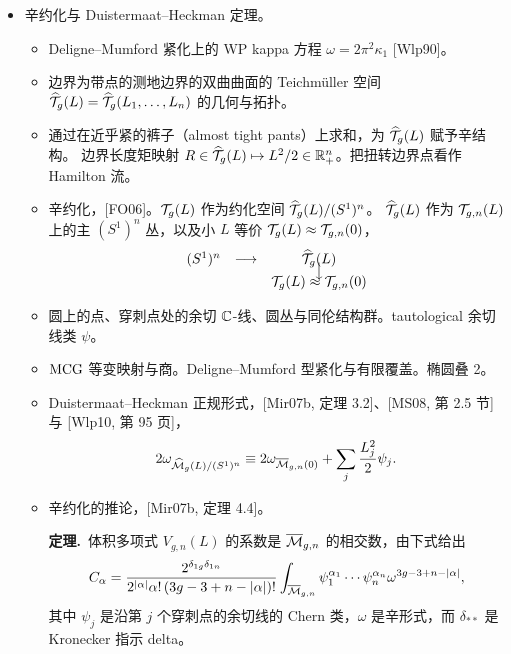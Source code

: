 \begin{itemize}[leftmargin=1.6em,itemsep=2pt,topsep=2pt]
\item 辛约化与 Duistermaat--Heckman 定理。
  \begin{itemize}[leftmargin=1.6em,itemsep=2pt,topsep=2pt]
  \item Deligne--Mumford 紧化上的 WP kappa 方程 $\omega=2\pi^2\kappa_1$ [Wlp90]。
  \item 边界为带点的测地边界的双曲曲面的 Teichmüller 空间
    $\widehat{\mathcal{T}}_g(L)=\widehat{\mathcal{T}}_g(L_1,\ldots,L_n)$ 的几何与拓扑。
  \item 通过在近乎紧的裤子（almost tight pants）上求和，为 $\widehat{\mathcal{T}}_g(L)$ 赋予辛结构。
    边界长度矩映射 $R\in\widehat{\mathcal{T}}_g(L)\mapsto L^2/2\in\mathbb{R}^n_+$。把扭转边界点看作
    Hamilton 流。
  \item 辛约化，[FO06]。$\mathcal{T}_g(L)$ 作为约化空间 $\widehat{\mathcal{T}}_g(L)/(S^1)^n$。
    $\widehat{\mathcal{T}}_g(L)$ 作为 $\mathcal{T}_{g,n}(L)$ 上的主 $(S^1)^n$ 丛，以及小 $L$ 等价
    $\mathcal{T}_g(L)\approx\mathcal{T}_{g,n}(0)$，
    \[
    \begin{array}{ccc}
    (S^1)^n & \longrightarrow & \widehat{\mathcal{T}}_g(L)\\[-4pt]
    & & \big\downarrow\\[-4pt]
    & & \mathcal{T}_g(L)\approx\mathcal{T}_{g,n}(0)
    \end{array}
    \]
  \item 圆上的点、穿刺点处的余切 $\mathbb{C}$-线、圆丛与同伦结构群。tautological 余切线类
    $\psi$。
  \item $\mathrm{MCG}$ 等变映射与商。Deligne--Mumford 型紧化与有限覆盖。椭圆叠 2。
  \item Duistermaat--Heckman 正规形式，[Mir07b, 定理 3.2]、[MS08, 第 2.5 节] 与
    [Wlp10, 第 95 页]，
    \[
    2\omega_{\widehat{\mathcal{M}}_g(L)/(S^1)^n}\equiv 2\omega_{\overline{\mathcal{M}}_{g,n}(0)}+\sum_j\frac{L_j^2}{2}\psi_j.
    \]
  \item 辛约化的推论，[Mir07b, 定理 4.4]。

    \textbf{定理.}\ 体积多项式 $V_{g,n}(L)$ 的系数是 $\overline{\mathcal{M}}_{g,n}$ 的相交数，由下式给出
    \[
    C_\alpha=\frac{2^{\delta_{1g}\delta_{1n}}}{2^{|\alpha|}\alpha!\,(3g-3+n-|\alpha|)!}
    \int_{\overline{\mathcal{M}}_{g,n}}\psi_1^{\alpha_1}\cdots\psi_n^{\alpha_n}\omega^{3g-3+n-|\alpha|},
    \]
    其中 $\psi_j$ 是沿第 $j$ 个穿刺点的余切线的 Chern 类，$\omega$ 是辛形式，而
    $\delta_{**}$ 是 Kronecker 指示 delta。
  \end{itemize}


\end{itemize}
